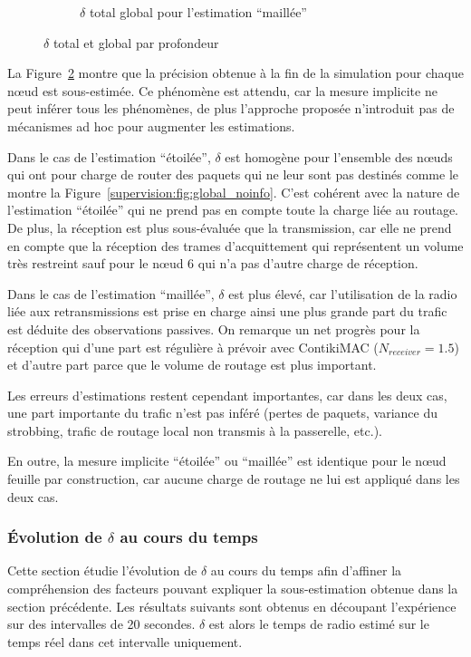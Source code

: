 \begin{figure}[ht]
\begin{subfigure}{0.5\textwidth}
    \caption{$\delta$ total global pour l'estimation ``maillée''}
    \label{supervision:fig:global_route}
  \end{subfigure}
  \caption{$\delta$ total et global par profondeur}
  \label{supervision:fig:global}
\end{figure}

La Figure~\ref{supervision:fig:global} montre que la précision obtenue à la fin de la simulation pour chaque nœud est sous-estimée.
Ce phénomène est attendu, car la mesure implicite ne peut inférer tous les phénomènes, de plus l'approche proposée n'introduit pas de mécanismes ad hoc pour augmenter les estimations.

Dans le cas de l'estimation ``étoilée'', $\delta$ est homogène pour l'ensemble des nœuds qui ont pour charge de router des paquets qui ne leur sont pas destinés comme le montre la Figure~\ref{supervision:fig:global_noinfo}.
C'est cohérent avec la nature de l'estimation ``étoilée'' qui ne prend pas en compte toute la charge liée au routage.
De plus, la réception est plus sous-évaluée que la transmission, car elle ne prend en compte que la réception des trames d'acquittement qui représentent un volume très restreint sauf pour le nœud 6 qui n'a pas d'autre charge de réception.

Dans le cas de l'estimation ``maillée'', $\delta$ est plus élevé, car l'utilisation de la radio liée aux retransmissions est prise en charge ainsi une plus grande part du trafic est déduite des observations passives.
On remarque un net progrès pour la réception qui d'une part est régulière à prévoir avec ContikiMAC ($N_{receiver} = 1.5$) et d'autre part parce que le volume de routage est plus important.

Les erreurs d'estimations restent cependant importantes, car dans les deux cas, une part importante du trafic n'est pas inféré (pertes de paquets, variance du strobbing, trafic de routage local non transmis à la passerelle, etc.).

En outre, la mesure implicite ``étoilée'' ou ``maillée'' est identique pour le nœud feuille par construction, car aucune charge de routage ne lui est appliqué dans les deux cas.

\subsubsection{Évolution de $\delta$ au cours du temps}

Cette section étudie l'évolution de $\delta$ au cours du temps afin d'affiner la compréhension des facteurs pouvant expliquer la sous-estimation obtenue dans la section précédente.
Les résultats suivants sont obtenus en découpant l'expérience sur des intervalles de 20 secondes.
$\delta$ est alors le temps de radio estimé sur le temps réel dans cet intervalle uniquement.

